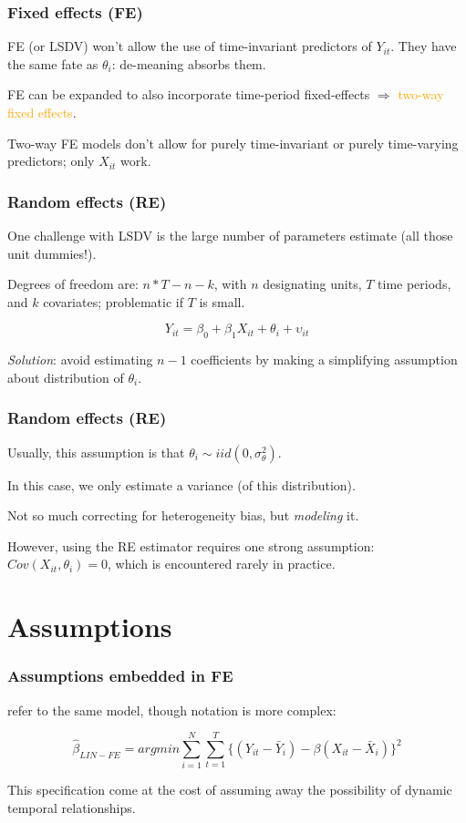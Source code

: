 \documentclass[11pt,english,dvipsnames,aspectratio=169,handout]{beamer}\usepackage[]{graphicx}\usepackage[]{xcolor}
\begin{document}
\begin{frame}
  \frametitle{Fixed effects (FE)}
  FE (or LSDV) won't allow the use of time-invariant predictors of $Y_{it}$. They have the same fate as $\theta_i$: de-meaning absorbs them.\bigskip
  \pause
  
  FE can be expanded to also incorporate time-period fixed-effects $\Rightarrow$ \textcolor{orange}{two-way fixed effects}.\bigskip
  \pause
  
  Two-way FE models don't allow for purely time-invariant or purely time-varying predictors; only $X_{it}$ work.

\end{frame}


\begin{frame}
  \frametitle{Random effects (RE)}
  One challenge with LSDV is the large number of parameters estimate (all those unit dummies!).\bigskip
  \pause
  
  Degrees of freedom are: $n*T - n - k$, with $n$ designating units, $T$ time periods, and $k$ covariates; problematic if $T$ is small.\bigskip
  \pause
  
  \begin{equation}
    Y_{it} = \beta_0 + \beta_1X_{it} + \theta_i + \upsilon_{it}
  \end{equation}
  
 \textit{Solution}: avoid estimating $n-1$ coefficients by making a simplifying assumption about distribution of $\theta_i$.
\end{frame}


\begin{frame}
  \frametitle{Random effects (RE)}
  Usually, this assumption is that $\theta_i \sim iid (0, \sigma_{\theta}^2)$.\bigskip
  \pause
  
  In this case, we only estimate a variance (of this distribution).\bigskip
  \pause
  
  Not so much correcting for heterogeneity bias, but \textit{modeling} it.\bigskip
  \pause
  
  However, using the RE estimator requires one strong assumption: $Cov(X_{it}, \theta_i) = 0$, which is encountered rarely in practice.
  
\end{frame}


\section{Assumptions}

\begin{frame}
  \frametitle{Assumptions embedded in FE}
   refer to the same model, though notation is more complex:
  
  \begin{equation}
    \hat{\beta}_{LIN-FE} = argmin\sum_{i=1}^N\sum_{t=1}^T\{(Y_{it} - \bar{Y}_i) - \beta (X_{it} - \bar{X}_i)\}^2
  \end{equation}\pause
  
  This specification come at the cost of assuming away the possibility of dynamic temporal relationships.
  
\end{frame}
\end{document}
